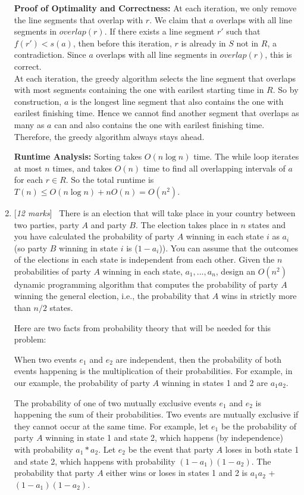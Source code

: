 \documentclass[11pt]{article}
\newcommand{\Q}[1]{\medskip\item {[{\em #1 marks\/}]}\ }
\begin{document}
\begin{enumerate}
\textbf{Proof of Optimality and Correctness:} At each iteration, we only remove the line segments that 
overlap with $r$. We claim that $a$ overlaps with all line segments in $overlap(r)$. If there exists a line 
segment $r'$ such that $f(r') < s(a)$, then before this iteration, $r$ is already in $S$ not in $R$, a 
contradiction. Since $a$ overlaps with all line segments in $overlap(r)$, this is correct.\\
At each iteration, the greedy algorithm selects the line segment that overlaps with most segments containing the 
one with earilest starting time in $R$. So by construction, $a$ is the longest line segment that also contains 
the one with earilest finishing time. Hence we cannot find another segment that overlaps as many as $a$ can and 
also contains the one with earilest finishing time. Therefore, the greedy algorithm always stays ahead.

\textbf{Runtime Analysis:} Sorting takes $O(n \log n)$ time. The while loop iterates at most $n$ times, and takes 
$O(n)$ time to find all overlapping intervals of $a$ for each $r \in R$. 
So the total runtime is $T(n) \leq O(n \log n) + n O(n) = O(n^2)$.

\newpage
\Q{12} There is an election that will take place in your country between two parties, party $A$ and party $B$. The election takes place in $n$ states and you have calculated the probability of party $A$ winning in each state $i$ as $a_i$ (so party $B$ winning in state $i$ is ($1-a_i$)). You can assume that the outcomes of the elections in each state is independent from each other. Given the $n$ probabilities of party $A$ winning in each state, $a_1, ..., a_n$, design an $O(n^2)$ dynamic programming algorithm that computes the probability of party $A$ winning the general election, i.e., the probability that $A$ wins in strictly more than $n/2$ states.

Here are two facts from probability theory that will be needed for this problem: 

 When two events $e_1$ and $e_2$ are independent, then the probability of both events happening is the multiplication of their probabilities. For example, in our example, the probability of party $A$ winning in states 1 and 2 are $a_1a_2$. 

 The probability of one of two mutually exclusive events $e_1$ and $e_2$ is happening the sum of their probabilities. Two events are mutually exclusive if they cannot occur at the same time. For example, let $e_1$ be the probability of party $A$ winning in state 1 and state 2, which happens (by independence) with probability $a_1*a_2$. Let $e_2$ be the event that party $A$ loses in both state 1 and state 2, which happens with probability $(1-a_1)(1-a_2)$. The probability that party $A$ either wins or loses in states 1 and 2 is $a_1a_2$ + $(1-a_1)(1-a_2)$.


\end{enumerate}
\end{document}
